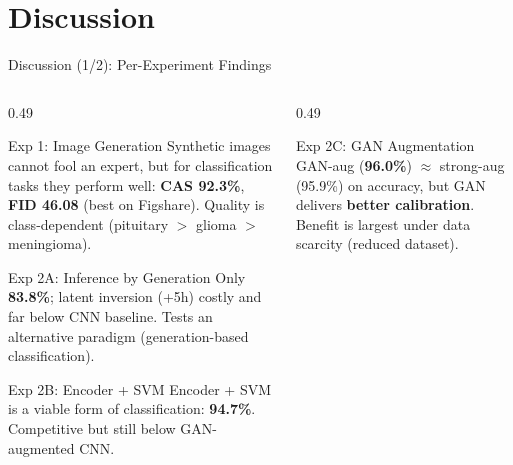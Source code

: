 \documentclass[aspectratio=169]{beamer}
\begin{document}
\section{Discussion}
\begin{frame}{Discussion (1/2): Per-Experiment Findings}
  \scriptsize
  \begin{columns}[T]
    \begin{column}{0.49\textwidth}
      \begin{minipage}[t][0.82\textheight][s]{\linewidth}
      {%
      \begin{block}{Exp 1: Image Generation}
        Synthetic images cannot fool an expert, but for classification tasks they perform well: \textbf{CAS 92.3\%}, \textbf{FID 46.08} (best on Figshare). Quality is class-dependent (pituitary $>$ glioma $>$ meningioma).
      \end{block}}

      \vfill
      {%
      \begin{block}{Exp 2A: Inference by Generation}
        Only \textbf{83.8\%}; latent inversion (+5h) costly and far below CNN baseline. Tests an alternative paradigm (generation-based classification).
      \end{block}}

      \vfill
      {%
      \begin{block}{Exp 2B: Encoder + SVM}
        Encoder + SVM is a viable form of classification: \textbf{94.7\%}. Competitive but still below GAN-augmented CNN.
      \end{block}}
      \end{minipage}
    \end{column}
    \begin{column}{0.49\textwidth}
      \begin{minipage}[t][0.82\textheight][s]{\linewidth}
      {%
      \begin{block}{Exp 2C: GAN Augmentation}
        GAN-aug (\textbf{96.0\%}) $\approx$ strong-aug (95.9\%) on accuracy, but GAN delivers \textbf{better calibration}. Benefit is largest under data scarcity (reduced dataset).
      \end{block}}


\end{minipage}
\end{column}
\end{columns}
\end{frame}
\end{document}
